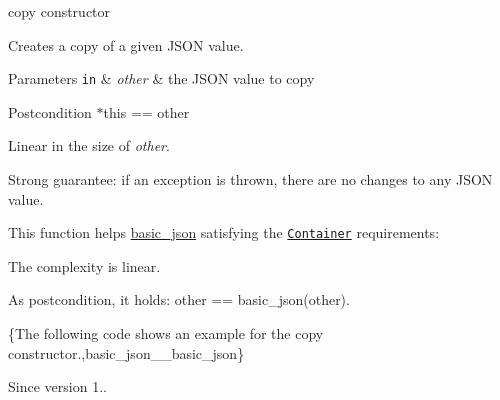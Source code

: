 copy constructor 

Creates a copy of a given J\+S\+ON value.


\begin{DoxyParams}[1]{Parameters}
\mbox{\tt in}  & {\em other} & the J\+S\+ON value to copy\\
\hline
\end{DoxyParams}
\begin{DoxyPostcond}{Postcondition}
{\ttfamily $\ast$this == other}
\end{DoxyPostcond}
Linear in the size of {\itshape other}.

Strong guarantee\+: if an exception is thrown, there are no changes to any J\+S\+ON value.

This function helps {\ttfamily \mbox{\hyperlink{classnlohmann_1_1basic__json}{basic\+\_\+json}}} satisfying the \href{http://en.cppreference.com/w/cpp/concept/Container}{\tt Container} requirements\+:
\begin{DoxyItemize}
\item The complexity is linear.
\item As postcondition, it holds\+: {\ttfamily other == basic\+\_\+json(other)}.
\end{DoxyItemize}

\{The following code shows an example for the copy constructor.,basic\+\_\+json\+\_\+\+\_\+basic\+\_\+json\}

\begin{DoxySince}{Since}
version 1.. 
\end{DoxySince}
\mbox{\label{classnlohmann_1_1basic__json_a9a06d1efd50a00f4889f831f851ce124}} 
